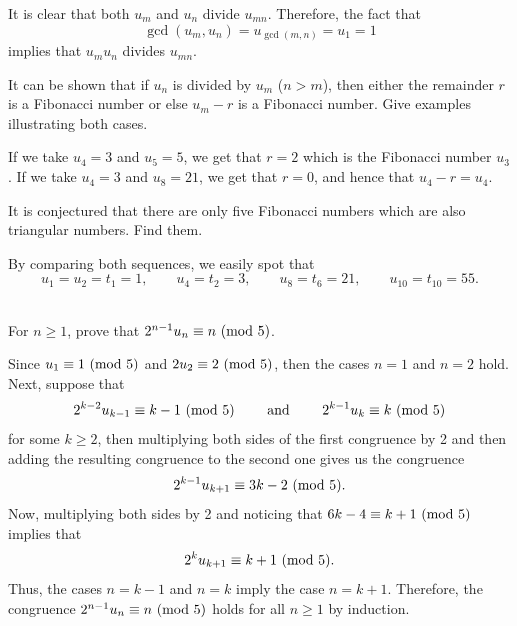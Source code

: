 \begin{solution}
    It is clear that both $u_m$ and $u_n$ divide $u_{mn}$. Therefore, the fact that
    $$\gcd(u_m, u_n) = u_{\gcd(m,n)} = u_1 = 1$$
    implies that $u_m u_n$ divides $u_{mn}$. \\
\end{solution}

\begin{exercise}
    It can be shown that if $u_n$ is divided by $u_m$ ($n > m$), then either the remainder $r$ is a Fibonacci number or else $u_m - r$ is a Fibonacci number. Give examples illustrating both cases. \\
\end{exercise}

\begin{solution}
    If we take $u_4 = 3$ and $u_5 = 5$, we get that $r = 2$ which is the Fibonacci number $u_3$. If we take $u_4 = 3$ and $u_8 = 21$, we get that $r = 0$, and hence that $u_4 - r = u_4$. \\
\end{solution}

\begin{exercise}
    It is conjectured that there are only five Fibonacci numbers which are also triangular numbers. Find them. \\
\end{exercise}

\begin{solution}
    By comparing both sequences, we easily spot that
    $$u_1 = u_2 = t_1 = 1, \qquad u_4 = t_2  = 3, \qquad u_8 = t_6 = 21, \qquad u_{10} = t_{10} = 55.$$ \\
\end{solution}

\begin{exercise}
    For $n \geq 1$, prove that $2^{n-1}u_n \equiv n \ (\mathrm{mod}\ 5)$.  \\
\end{exercise}

\begin{solution}
    Since $u_1 \equiv 1 \ (\mathrm{mod}\ 5)$ and $2u_2 \equiv 2 \ (\mathrm{mod}\ 5)$, then the cases $n = 1$ and $n = 2$ hold. Next, suppose that
    $$2^{k-2}u_{k-1} \equiv k-1 \ (\mathrm{mod}\ 5) \qquad \text{ and } \qquad 2^{k-1}u_k \equiv k \ (\mathrm{mod}\ 5)$$
    for some $k \geq 2$, then multiplying both sides of the first congruence by 2 and then adding the resulting congruence to the second one gives us the congruence
    $$2^{k-1}u_{k+1} \equiv 3k -2 \ (\mathrm{mod}\ 5).$$
    Now, multiplying both sides by 2 and noticing that $6k - 4\equiv k+1 \ (\mathrm{mod}\ 5)$ implies that
    $$2^ku_{k+1} \equiv k + 1 \ (\mathrm{mod}\ 5).$$
    Thus, the cases $n = k-1$ and $n = k$ imply the case $n = k+1$. Therefore, the congruence $2^{n-1}u_n \equiv n \ (\mathrm{mod}\ 5)$ holds for all $n\geq 1$ by induction. \\
\end{solution}

